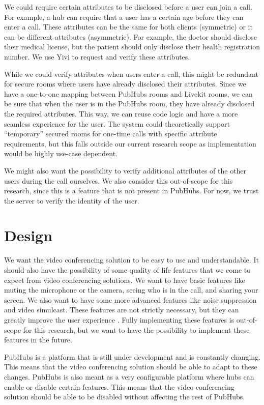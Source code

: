 \documentclass{report}
\begin{document}
We could require certain attributes to be disclosed before a user can join a call. For example, a hub
can require that a user has a certain age before they can enter a call. These attributes can be the same for both
clients (symmetric) or it can be different attributes (asymmetric). For example, the doctor should disclose their medical
license, but the patient should only disclose their health registration number. We use Yivi to request and verify these
attributes.

While we could verify attributes when users enter a call, this might be redundant for secure rooms where users have
already disclosed their attributes. Since we have a one-to-one mapping between PubHubs rooms and Livekit rooms, we
can be sure that when the user is in the PubHubs room, they have already disclosed the required attributes. This way,
we can reuse code logic and have a more seamless experience for the user. The system could theoretically support
“temporary” secured rooms for one-time calls with specific attribute requirements, but this falls outside our current
research scope as implementation would be highly use-case dependent.

We might also want the possibility to verify additional attributes of the other users during the call ourselves. We also
consider this out-of-scope for this research, since this is a feature that is not present in PubHubs. For now, we trust
the server to verify the identity of the user.

\section{Design}
We want the video conferencing solution to be easy to use and understandable. It should also have the possibility of
some quality of life features that we come to expect from video conferencing solutions. We want to have basic
features like muting the microphone or the camera, seeing who is in the call, and sharing your screen. We also want
to have some more advanced features like noise suppression and video simulcast. These features are not strictly
necessary, but they can greatly improve the user experience \cite{skowronek_quality_2022}.
Fully implementing these features is out-of-scope for this research, but we want to have the possibility to implement
these features in the future.

PubHubs is a platform that is still under development and is constantly changing. This means that the video
conferencing solution should be able to adapt to these changes. PubHubs is also meant as a very configurable platform
where hubs can enable or disable certain features. This means that the video conferencing solution should be able to
be disabled without affecting the rest of PubHubs.
\end{document}
